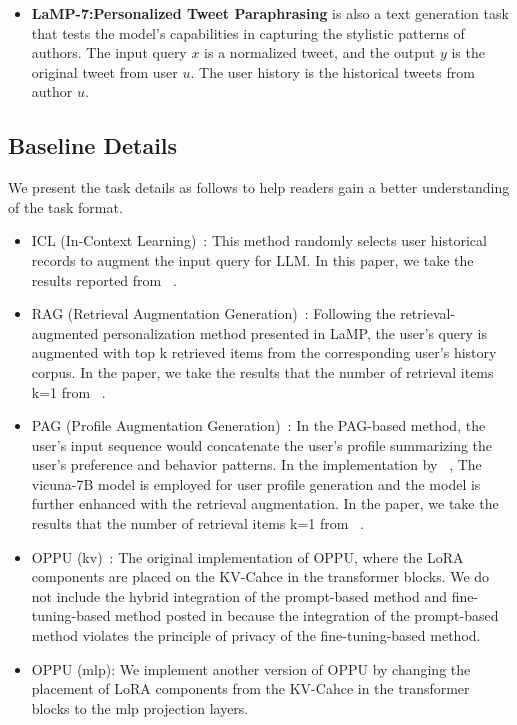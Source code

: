 \documentclass[11pt]{article}
\begin{document}
\begin{itemize}
    \item \textbf{LaMP-7:Personalized Tweet Paraphrasing} is also a text generation task that tests the model’s capabilities in capturing the stylistic patterns of authors. The input query $x$ is a normalized tweet, and the output $y$ is the original tweet from user $u$. The user history is the historical tweets from author $u$.
\end{itemize}


\subsection{Baseline Details}
\label{sec:appendix-baseline}
We present the task details as follows to help readers gain a better understanding of the task format.
\begin{itemize}
    \item ICL (In-Context Learning)~\cite{dai2023uncovering}: This method randomly selects user historical records to augment the input query for LLM. In this paper, we take the results reported from ~\cite{tan-etal-2024-democratizing}.
    \item RAG (Retrieval Augmentation Generation)~\cite{salemi-etal-2024-lamp}: Following the retrieval-augmented personalization method presented in LaMP, the user’s query is augmented with top k retrieved items from the corresponding user’s history corpus. In the paper, we take the results that the number of retrieval items k=1 from ~\cite{tan-etal-2024-democratizing}.
    \item PAG (Profile Augmentation Generation)~\cite{richardson2023integrating}: In the PAG-based method, the user’s input sequence would concatenate the user’s profile summarizing the user’s preference and behavior patterns. In the implementation by ~\cite{tan-etal-2024-democratizing}, The vicuna-7B model is employed for user profile generation and the model is further enhanced with the retrieval augmentation. In the paper, we take the results that the number of retrieval items k=1 from ~\cite{tan-etal-2024-democratizing}.
    \item OPPU (kv)~\citet{tan-etal-2024-democratizing}: The original implementation of OPPU, where the LoRA components are placed on the KV-Cahce in the transformer blocks. We do not include the hybrid integration of the prompt-based method and fine-tuning-based method posted in \cite{tan-etal-2024-democratizing} because the integration of the prompt-based method violates the principle of privacy of the fine-tuning-based method. 
    \item OPPU (mlp): We implement another version of OPPU by changing the placement of LoRA components from the KV-Cahce in the transformer blocks to the mlp projection layers. 
\end{itemize}
\end{document}
